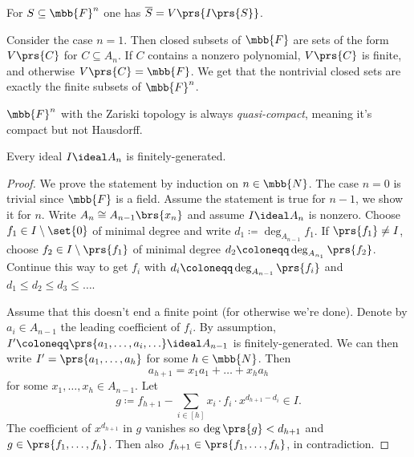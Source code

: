 \documentclass[10pt,a4paper,twoside,openany,hidelinks]{book}
\begin{document}
\begin{exercise}
For $S \subseteq \mbb{F}^n$ one has $\overline{S} = V\prs{I\prs{S}}$.
\end{exercise}

\begin{example}
Consider the case $n=1$. Then closed subsets of $\mbb{F}$ are sets of the form $V\prs{C}$ for $C \subseteq A_n$. If $C$ contains a nonzero polynomial, $V\prs{C}$ is finite, and otherwise $V\prs{C} = \mbb{F}$. We get that the nontrivial closed sets are exactly the finite subsets of $\mbb{F}^n$.
\end{example}

\begin{remark}
$\mbb{F}^n$ with the Zariski topology is always \emph{quasi-compact}, meaning it's compact but not Hausdorff.
\end{remark}

\begin{theorem}\label{theorem:basis_theorem}
Every ideal $I \ideal A_n$ is finitely-generated.
\end{theorem}

\begin{proof}
We prove the statement by induction on $n \in \mbb{N}$. The case $n = 0$ is trivial since $\mbb{F}$ is a field. Assume the statement is true for $n-1$, we show it for $n$.
Write $A_n \cong A_{n-1}\brs{x_n}$ and assume $I \ideal A_n$ is nonzero. Choose $f_1 \in I \setminus \set{0}$ of minimal degree and write $d_1 \coloneqq \deg_{A_{n-1}}{f_1}$. If $\prs{f_1} \neq I$, choose $f_2 \in I\setminus\prs{f_1}$ of minimal degree $d_2 \coloneqq \deg_{A_{n_1}}\prs{f_2}$. Continue this way to get $f_i$ with $d_i \coloneqq \deg_{A_{n-1}}\prs{f_i}$ and $d_1 \leq d_2 \leq d_3 \leq \ldots $.

Assume that this doesn't end a finite point (for otherwise we're done). Denote by $a_i \in A_{n-1}$ the leading coefficient of $f_i$. By assumption, $I' \coloneqq \prs{a_1, \ldots, a_i, \ldots} \ideal A_{n-1}$ is finitely-generated. We can then write $I' = \prs{a_1, \ldots, a_h}$ for some $h \in \mbb{N}$. Then
\[a_{h+1} = x_1 a_1 + \ldots + x_h a_h\]
for some $x_1, \ldots, x_h \in A_{n-1}$.
Let
\[g \coloneqq f_{h+1} - \sum_{i \in [h]} x_i \cdot f_i \cdot x^{d_{h+1} - d_i} \in I \text{.}\]
The coefficient of $x^{d_{h+1}}$ in $g$ vanishes so $\deg\prs{g} < d_{h+1}$ and $g \in \prs{f_1,\ldots, f_h}$. Then also $f_{h+1} \in \prs{f_1, \ldots, f_h}$, in contradiction.
\end{proof}
\end{document}
